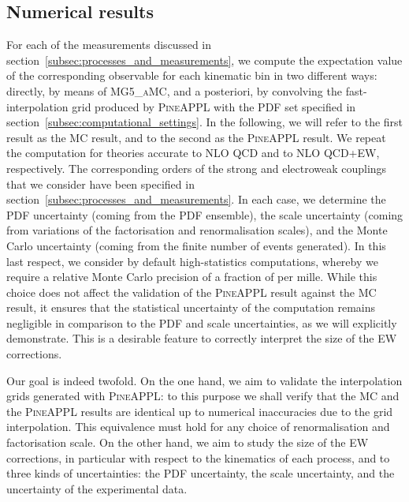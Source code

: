 \subsection{Numerical results}
\label{subsec:numerical_results}

For each of the measurements discussed in
section~\ref{subsec:processes_and_measurements}, we compute the expectation
value of the corresponding observable for each kinematic bin in two different
ways: directly, by means of \textsc{MG5\_aMC}, and a posteriori, by convolving
the fast-interpolation grid produced by \textsc{PineAPPL} with the PDF set
specified in section~\ref{subsec:computational_settings}. In the following, we
will refer to the first result as the MC result, and to the second as
the \textsc{PineAPPL} result. We repeat the computation for theories accurate
to NLO QCD and to NLO QCD+EW, respectively. The corresponding orders of the
strong and electroweak couplings that we consider have been specified in
section~\ref{subsec:processes_and_measurements}. In each case, we determine the
PDF uncertainty (coming from the PDF ensemble), the scale uncertainty (coming
from variations of the factorisation and renormalisation scales), and the Monte
Carlo uncertainty (coming from the finite number of events generated). In this
last respect, we consider by default high-statistics computations, whereby we
require a relative Monte Carlo precision of a fraction of per mille. While
this choice does not affect the validation of the \textsc{PineAPPL} result
against the MC result, it ensures that the statistical uncertainty of
the computation remains negligible in comparison to the PDF and scale
uncertainties, as we will explicitly demonstrate. This is a desirable feature
to correctly interpret the size of the EW corrections.

Our goal is indeed twofold. On the one hand, we aim to validate the
interpolation grids generated with \textsc{PineAPPL}: to this purpose we shall
verify that the MC and the \textsc{PineAPPL} results are identical up to
numerical inaccuracies due to the grid interpolation. This equivalence must
hold for any choice of renormalisation and factorisation scale. On the other
hand, we aim to study the size of the EW corrections, in particular with
respect to the kinematics of each process, and to three kinds of uncertainties:
the PDF uncertainty, the scale uncertainty, and the uncertainty of the
experimental data.

